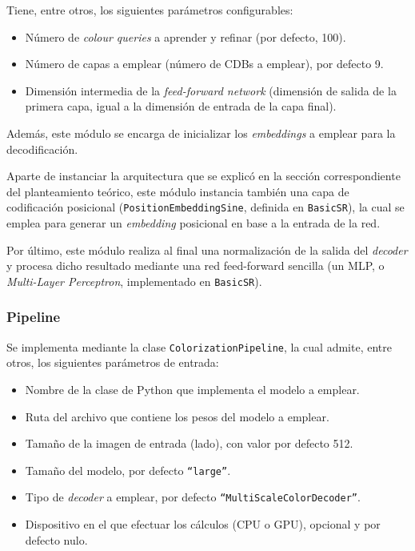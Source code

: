\documentclass[a4paper]{article}
\begin{document}
Tiene, entre otros, los siguientes parámetros configurables:

\begin{itemize}
  \item{Número de \textit{colour queries} a aprender y refinar (por defecto, 100).}
  \item{Número de capas a emplear (número de CDBs a emplear), por defecto 9.}
  \item{Dimensión intermedia de la \textit{feed-forward network} (dimensión de salida de la primera capa, igual a la dimensión de entrada de la capa final).}
\end{itemize}

Además, este módulo se encarga de inicializar los \textit{embeddings} a emplear para la decodificación.

Aparte de instanciar la arquitectura que se explicó en la sección correspondiente del planteamiento teórico, este módulo instancia también una capa de codificación posicional (\texttt{PositionEmbeddingSine}, definida en \texttt{BasicSR}), la cual se emplea para generar un \textit{embedding} posicional en base a la entrada de la red.

Por último, este módulo realiza al final una normalización de la salida del \textit{decoder} y procesa dicho resultado mediante una red feed-forward sencilla (un MLP, o \textit{Multi-Layer Perceptron}, implementado en \texttt{BasicSR}).

\subsubsection{Pipeline}

Se implementa mediante la clase \texttt{ColorizationPipeline}, la cual admite, entre otros, los siguientes parámetros de entrada:

\begin{itemize}
  \item{Nombre de la clase de Python que implementa el modelo a emplear.}
  \item{Ruta del archivo que contiene los pesos del modelo a emplear.}
  \item{Tamaño de la imagen de entrada (lado), con valor por defecto 512.}
  \item{Tamaño del modelo, por defecto \texttt{``large''}.}
  \item{Tipo de \textit{decoder} a emplear, por defecto \texttt{``MultiScaleColorDecoder''}.}
  \item{Dispositivo en el que efectuar los cálculos (CPU o GPU), opcional y por defecto nulo.}
\end{itemize}
\end{document}
